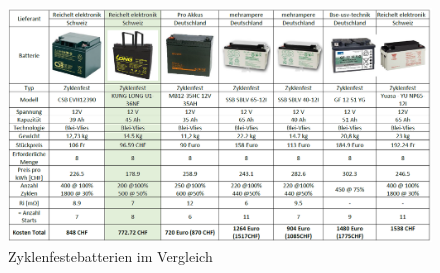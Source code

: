 \begin{appendix}
\begin{landscape}
	\begin{figure}[H]
		\begin{center}
			\includegraphics[width=240mm]{appendix/BatterieZyklenfest.png}
			\caption[Zyklenfestebatterien]{Zyklenfestebatterien im Vergleich} %
			\label{fig:Zyklenfestebatterie}
		\end{center}
	\end{figure}
\end{landscape}

\end{appendix}
